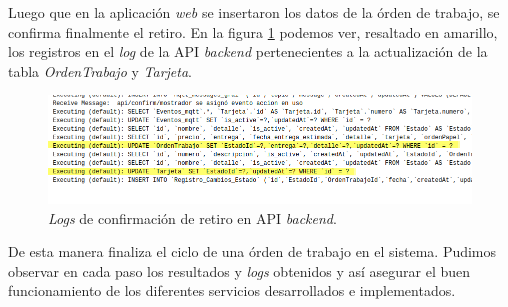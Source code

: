 Luego que en la aplicación \textit{web} se insertaron los datos de la órden de trabajo, se confirma finalmente el retiro. En la figura \ref{fig:ensayoretirarconfirmacionapi} podemos ver, resaltado en amarillo, los registros en el \textit{log} de la API \textit{backend} pertenecientes a la actualización de la tabla \textit{OrdenTrabajo} y \textit{Tarjeta}. 
 
\begin{figure}[H]
	\centering
	\includegraphics[width=\textwidth]{./Figures/ensayo-1/24.retirar-confirmacion-api.png}
	\caption{\textit{Logs} de confirmación de retiro en API \textit{backend}.}
	\label{fig:ensayoretirarconfirmacionapi}
\end{figure}

De esta manera finaliza el ciclo de una órden de trabajo en el sistema. Pudimos observar en cada paso los resultados y \textit{logs} obtenidos y así asegurar el buen funcionamiento de los diferentes servicios desarrollados e implementados.




